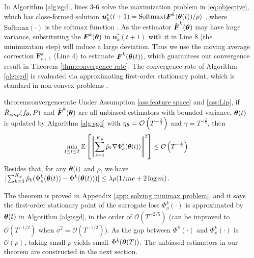\documentclass{article} %
\newcommand{\btheta}{\text{\boldmath{$\theta$}}}
\newcommand{\bF}{\boldsymbol{F}}
\newcommand{\bu}{\boldsymbol{u}}
\newcommand{\mE}{\mathbb{E}}
\newcommand{\cO}{\mathcal{O}}
\begin{document}
	\par
	In Algorithm \ref{alg:sgd}, lines 3-6 solve the maximization problem in \eqref{eq:objective}, which has close-formed solution $\bu_{k}^{*}(t + 1) = \mathrm{Softmax}(\bF^{k}(\btheta(t)) / \rho)$ \citep{yi2021reweighting}, where $\mathrm{Softmax}(\cdot)$ is the softmax function \citep{epasto2020optimal}. As the estimator $\hat{\bF}^{k}(\btheta)$ may have large variance, substituting the $\bF^{k}(\btheta)$ in $\bu_{k}^{*}(t + 1)$ with it in Line 8 (the minimization step) will induce a large deviation. Thus we use the moving average correction $\bF_{t + 1}^{k}$ (Line 4) to estimate $\bF^{k}(\btheta(t))$, which guarantees our convergence result in Theorem \ref{thm:convergence rate}. The convergence rate of Algorithm \ref{alg:sgd} is evaluated via approximating first-order stationary point, which is standard in non-convex problems \citep{ghadimi2013stochastic,lin2020gradient}.
	\begin{restatable}{theorem}{convergencerate}
		\label{thm:convergence rate}
		Under Assumption \ref{ass:feature space} and \ref{ass:Lip}, if $\hat{R}_{emp}(f_{\btheta}, P)$ and $\hat{\bF}^{k}(\btheta)$ are all unbiased estimators with bounded variance, $\btheta(t)$ is updated by Algorithm \ref{alg:sgd} with $\eta_{\btheta} = \cO\left(T^{-\frac{3}{5}}\right)$ and $\gamma = T^{-\frac{2}{5}}$, then 
		\begin{equation}
			\small
			\min_{1\leq t\leq T}\mE\left[\left\|\sum\limits_{k=1}^{K_{y}}\hat{p}_{k}\nabla\Phi_{\rho}^{k}(\btheta(t))\right\|^{2}\right] \leq \cO\left(T^{-\frac{2}{5}}\right). 
		\end{equation}
		Besides that, for any $\btheta(t)$ and $\rho$, we have $|\sum_{k=1}^{K_{y}}\hat{p}_{k}(\Phi_{\rho}^{k}(\btheta(t)) - \Phi^{k}(\btheta(t)))| \leq \lambda\rho(1 / me + 2\log{m})$.
	\end{restatable}
	The theorem is proved in Appendix \ref{app: solving minimax problem}, and it says the first-order stationary point of the surrogate loss  $\Phi_{\rho}^{k}(\cdot)$ is approximated by $\btheta(t)$ in Algorithm \ref{alg:sgd}, in the order of $\cO(T^{-2/5})$ (can be improved to $\cO(T^{-1/2})$ when $\sigma^{2} = \cO(T^{-1/2})$). As the gap between $\Phi^{k}(\cdot)$ and $\Phi_{\rho}^{k}(\cdot)$ is $\cO(\rho)$, taking small $\rho$ yields small $\Phi^{k}(\btheta(T))$. The unbiased estimators in our theorem are constructed in the next section. 
\end{document}
